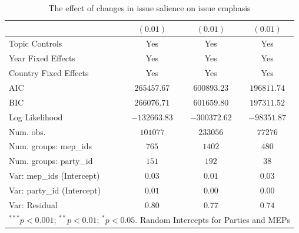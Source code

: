 \begin{table}
\begin{center}
\begin{tabular}{l c c c}
                                  & $(0.01)$     & $(0.01)$     & $(0.01)$     \\
\midrule
Topic Controls                    & Yes          & Yes          & Yes          \\
Year Fixed Effects                & Yes          & Yes          & Yes          \\
Country Fixed Effects             & Yes          & Yes          & Yes          \\
AIC                               & $265457.67$  & $600893.23$  & $196811.74$  \\
BIC                               & $266076.71$  & $601659.80$  & $197311.52$  \\
Log Likelihood                    & $-132663.83$ & $-300372.62$ & $-98351.87$  \\
Num. obs.                         & $101077$     & $233056$     & $77276$      \\
Num. groups: mep\_ids             & $765$        & $1402$       & $480$        \\
Num. groups: party\_id            & $151$        & $192$        & $38$         \\
Var: mep\_ids (Intercept)         & $0.03$       & $0.01$       & $0.03$       \\
Var: party\_id (Intercept)        & $0.01$       & $0.00$       & $0.00$       \\
Var: Residual                     & $0.80$       & $0.77$       & $0.74$       \\
\bottomrule
\multicolumn{4}{l}{\scriptsize{$^{***}p<0.001$; $^{**}p<0.01$; $^{*}p<0.05$. Random Intercepts for Parties and MEPs}}
\end{tabular}
\caption{The effect of changes in issue salience on issue emphasis}
\label{table:coefficients}
\end{center}
\end{table}
